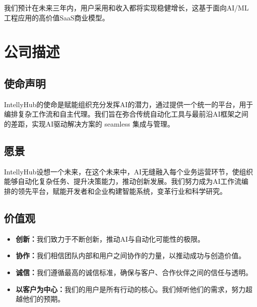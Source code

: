 \documentclass[11点, A4纸, 单面]{article}
\begin{document}
我们预计在未来三年内，用户采用和收入都将实现稳健增长，这基于面向AI/ML工程应用的高价值SaaS商业模型。

\section{公司描述}
\subsection{使命声明}
IntellyHub的使命是赋能组织充分发挥AI的潜力，通过提供一个统一的平台，用于编排复杂工作流和自主代理。我们旨在弥合传统自动化工具与最前沿AI框架之间的差距，实现AI驱动解决方案的 seamless 集成与管理。

\subsection{愿景}
IntellyHub设想一个未来，在这个未来中，AI无缝融入每个业务运营环节，使组织能够自动化复杂任务、提升决策能力，推动创新发展。我们努力成为AI工作流编排的领先平台，赋能开发者和企业构建智能系统，变革行业和科学研究。

\subsection{价值观}
\begin{itemize}
    \item \textbf{创新：}我们致力于不断创新，推动AI与自动化可能性的极限。
    \item \textbf{协作：}我们相信团队内部和用户之间协作的力量，以推动成功与创造价值。
    \item \textbf{诚信：}我们遵循最高的诚信标准，确保与客户、合作伙伴之间的信任与透明。
    \item \textbf{以客户为中心：}我们的用户是所有行动的核心。我们倾听他们的需求，努力超越他们的预期。
\end{itemize}
\end{document}

